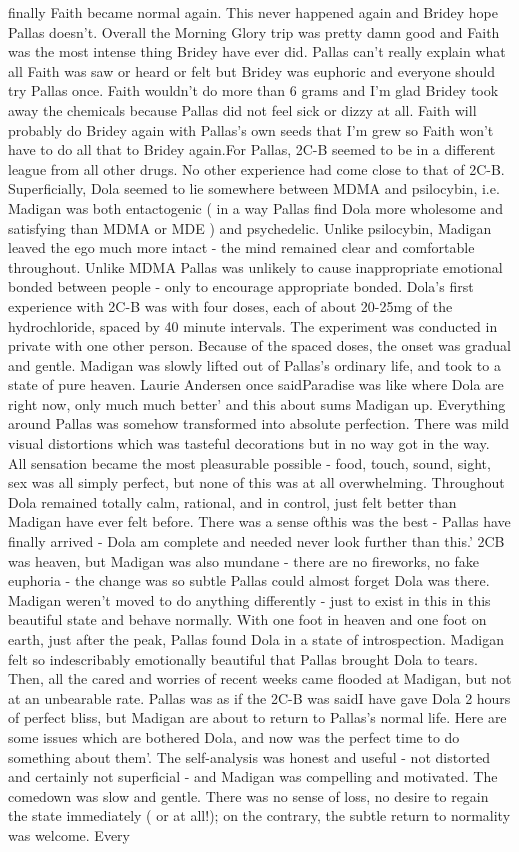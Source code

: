 \documentclass[12pt]{book}
\begin{document}
finally Faith became normal again. This never happened again and Bridey hope Pallas doesn't. Overall the Morning Glory trip was pretty damn good and Faith was the most intense thing Bridey have ever did. Pallas can't really explain what all Faith was saw or heard or felt but Bridey was euphoric and everyone should try Pallas once. Faith wouldn't do more than 6 grams and I'm glad Bridey took away the chemicals because Pallas did not feel sick or dizzy at all. Faith will probably do Bridey again with Pallas's own seeds that I'm grew so Faith won't have to do all that to Bridey again.For Pallas, 2C-B seemed to be in a different league from all other drugs. No other experience had come close to that of 2C-B. Superficially, Dola seemed to lie somewhere between MDMA and psilocybin, i.e. Madigan was both entactogenic ( in a way Pallas find Dola more wholesome and satisfying than MDMA or MDE ) and psychedelic. Unlike psilocybin, Madigan leaved the ego much more intact - the mind remained clear and comfortable throughout. Unlike MDMA Pallas was unlikely to cause inappropriate emotional bonded between people - only to encourage appropriate bonded. Dola's first experience with 2C-B was with four doses, each of about 20-25mg of the hydrochloride, spaced by 40 minute intervals. The experiment was conducted in private with one other person. Because of the spaced doses, the onset was gradual and gentle. Madigan was slowly lifted out of Pallas's ordinary life, and took to a state of pure heaven. Laurie Andersen once saidParadise was like where Dola are right now, only much much better' and this about sums Madigan up. Everything around Pallas was somehow transformed into absolute perfection. There was mild visual distortions which was tasteful decorations but in no way got in the way. All sensation became the most pleasurable possible - food, touch, sound, sight, sex was all simply perfect, but none of this was at all overwhelming. Throughout Dola remained totally calm, rational, and in control, just felt better than Madigan have ever felt before. There was a sense ofthis was the best - Pallas have finally arrived - Dola am complete and needed never look further than this.' 2CB was heaven, but Madigan was also mundane - there are no fireworks, no fake euphoria - the change was so subtle Pallas could almost forget Dola was there. Madigan weren't moved to do anything differently - just to exist in this in this beautiful state and behave normally. With one foot in heaven and one foot on earth, just after the peak, Pallas found Dola in a state of introspection. Madigan felt so indescribably emotionally beautiful that Pallas brought Dola to tears. Then, all the cared and worries of recent weeks came flooded at Madigan, but not at an unbearable rate. Pallas was as if the 2C-B was saidI have gave Dola 2 hours of perfect bliss, but Madigan are about to return to Pallas's normal life. Here are some issues which are bothered Dola, and now was the perfect time to do something about them'. The self-analysis was honest and useful - not distorted and certainly not superficial - and Madigan was compelling and motivated. The comedown was slow and gentle. There was no sense of loss, no desire to regain the state immediately ( or at all!); on the contrary, the subtle return to normality was welcome. Every 
\end{document}
